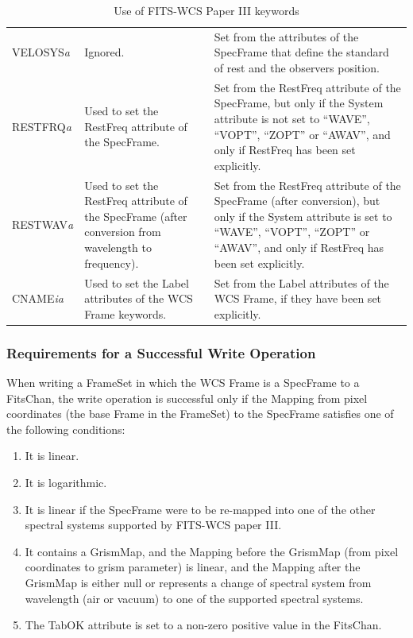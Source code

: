 \documentclass[twoside,11pt]{starlink}
\providecommand{\fitskey}[3]{{#1}&{#2}&{#3}\\}
\begin{document}
\begin{table}[htbp]
\begin{footnotesize}
\begin{tabular}{|l|p{2.5in}|p{2.5in}|}
\fitskey{VELOSYS\emph{a}}{Ignored.}{Set from the attributes of the
SpecFrame that define the standard of rest and the observers position.}

\fitskey{RESTFRQ\emph{a}}{Used to set the RestFreq
attribute of the SpecFrame.}{Set from the RestFreq attribute of the
SpecFrame, but only if the System attribute is not set to
``WAVE'', ``VOPT'', ``ZOPT'' or ``AWAV'', and only if RestFreq has been set
explicitly.}

\fitskey{RESTWAV\emph{a}}{Used to set the RestFreq
attribute of the SpecFrame (after conversion from wavelength to frequency).}
{Set from the RestFreq attribute of the SpecFrame (after conversion), but only if the
System attribute is set to ``WAVE'', ``VOPT'', ``ZOPT'' or
``AWAV'', and only if RestFreq has been set explicitly.}

\fitskey{CNAME\emph{ia}}{Used to set the Label attributes of
the WCS Frame keywords.}{Set from the Label attributes of the WCS Frame,
if they have been set explicitly.}
\hline
\end{tabular}
\end{footnotesize}
\vspace{3.mm}
\caption{Use of FITS-WCS Paper III keywords}
\label{tab:fitspaper3}
\end{table}

\subsubsection{Requirements for a Successful Write Operation}
When writing a FrameSet in which the WCS Frame is a SpecFrame to a
FitsChan, the write operation is successful only if
the Mapping from pixel coordinates (the base Frame
in the FrameSet) to the SpecFrame satisfies one of the following conditions:

\begin{enumerate}
\item It is linear.
\item It is logarithmic.
\item It is linear if the SpecFrame were to be re-mapped into one of the
other spectral systems supported by FITS-WCS paper III.
\item It contains a GrismMap, and the Mapping before the GrismMap (from
pixel coordinates to grism parameter) is linear, and the Mapping after the
GrismMap is either null or represents a change of spectral system from wavelength (air or
vacuum) to one of the supported spectral systems.
\item The TabOK attribute is set to a non-zero positive value in the FitsChan.
\end{enumerate}
\end{document}

